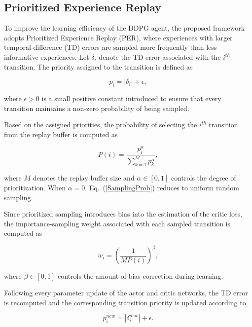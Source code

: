 \documentclass[10pt,journal,compsoc]{IEEEtran}
\begin{document}
\subsection{Prioritized Experience Replay}
\label{PER}

To improve the learning efficiency of the DDPG agent, the proposed framework adopts Prioritized Experience Replay (PER), where experiences with larger temporal-difference (TD) errors are sampled more frequently than less informative experiences. Let $\delta_i$ denote the TD error associated with the $i^{th}$ transition. The priority assigned to the transition is defined as \cite{sarker2026prioritybw}

\begin{equation}
\label{Priority}
p_i=|\delta_i|+\epsilon,
\end{equation}

where $\epsilon>0$ is a small positive constant introduced to ensure that every transition maintains a non-zero probability of being sampled.

Based on the assigned priorities, the probability of selecting the $i^{th}$ transition from the replay buffer is computed as \cite{sarker2026prioritybw}

\begin{equation}
\label{SamplingProb}
P(i)=
\frac{p_i^{\alpha}}
{\sum_{k=1}^{M}p_k^{\alpha}},
\end{equation}

where $M$ denotes the replay buffer size and $\alpha\in[0,1]$ controls the degree of prioritization. When $\alpha=0$, Eq.~(\ref{SamplingProb}) reduces to uniform random sampling.

Since prioritized sampling introduces bias into the estimation of the critic loss, the importance-sampling weight associated with each sampled transition is computed as \cite{sarker2026prioritybw}

\begin{equation}
\label{ISWeight}
w_i=
\left(
\frac{1}{MP(i)}
\right)^{\beta},
\end{equation}

where $\beta\in[0,1]$ controls the amount of bias correction during learning.

Following every parameter update of the actor and critic networks, the TD error is recomputed and the corresponding transition priority is updated according to \cite{sarker2026prioritybw}

\begin{equation}
\label{PriorityUpdate}
p_i^{new}=|\delta_i^{new}|+\epsilon.
\end{equation}
\end{document}
